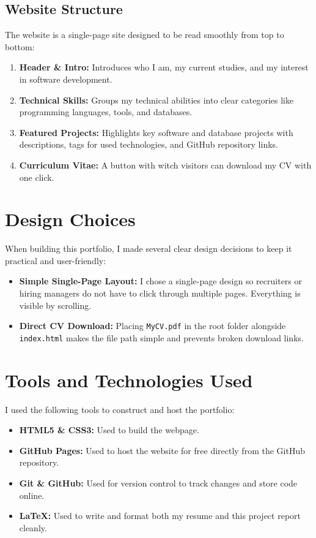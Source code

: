 \documentclass[11pt,a4paper]{article}
\begin{document}
\subsection{Website Structure}
The website is a single-page site designed to be read smoothly from top to bottom:
\begin{enumerate}
    \item \textbf{Header \& Intro:} Introduces who I am, my current studies, and my interest in software development.
    \item \textbf{Technical Skills:} Groups my technical abilities into clear categories like programming languages, tools, and databases.
    \item \textbf{Featured Projects:} Highlights key software and database projects with descriptions, tags for used technologies, and GitHub repository links.
    \item \textbf{Curriculum Vitae:} A button with witch visitors can download my CV with one click.
\end{enumerate}

\section{Design Choices}
When building this portfolio, I made several clear design decisions to keep it practical and user-friendly:

\begin{itemize}
    \item \textbf{Simple Single-Page Layout:} I chose a single-page design so recruiters or hiring managers do not have to click through multiple pages. Everything is visible by scrolling.
    \item \textbf{Direct CV Download:} Placing \texttt{MyCV.pdf} in the root folder alongside \texttt{index.html} makes the file path simple and prevents broken download links.
\end{itemize}

\section{Tools and Technologies Used}
I used the following tools to construct and host the portfolio:

\begin{itemize}
    \item \textbf{HTML5 \& CSS3:} Used to build the webpage.
    \item \textbf{GitHub Pages:} Used to host the website for free directly from the GitHub repository.
    \item \textbf{Git \& GitHub:} Used for version control to track changes and store code online.
    \item \textbf{\LaTeX:} Used to write and format both my resume and this project report cleanly.
\end{itemize}
\end{document}

